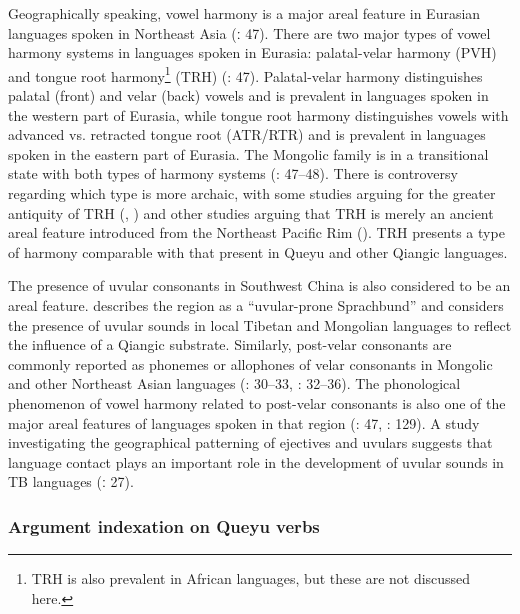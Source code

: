 \documentclass[output=paper]{langscibook}
\begin{document}
Geographically speaking, vowel harmony is a major areal feature in Eurasian languages spoken in Northeast Asia (\citealt{BarrereJanhunen2019}ː 47). There are two major types of vowel harmony systems in languages spoken in Eurasia: palatal-velar harmony (PVH) and tongue root harmony\footnote{TRH is also prevalent in African languages, but these are not discussed here.}  (TRH) (\citealt{BarrereJanhunen2019}: 47). Palatal-velar harmony distinguishes palatal (front) and velar (back) vowels and is prevalent in languages spoken in the western part of Eurasia, while tongue root harmony distinguishes vowels with advanced vs. retracted tongue root (ATR/RTR) and is prevalent in languages spoken in the eastern part of Eurasia. The Mongolic family is in a transitional state with both types of harmony systems (\citealt{BarrereJanhunen2019}: 47--48). There is controversy regarding which type is more archaic, with some studies arguing for the greater antiquity of TRH (\citealt{Ko2012}, \citealt{KoEtAl2014}) and other studies arguing that TRH is merely an ancient areal feature introduced from the Northeast Pacific Rim (\citealt{BarrereJanhunen2019}). TRH presents a type of harmony comparable with that present in Queyu and other Qiangic languages.

The presence of uvular consonants in Southwest China is also considered to be an areal feature. \citet[124]{Hill2019} describes the region as a “uvular-prone Sprachbund” and considers the presence of uvular sounds in local Tibetan and Mongolian languages to reflect the influence of a Qiangic substrate. Similarly, post-velar consonants are commonly reported as phonemes or allophones of velar consonants in Mongolic and other Northeast Asian languages (\citealt{Nugteren2011}: 30--33, \citealt{Sylak-Glassman2014}: 32--36). The phonological phenomenon of vowel harmony related to post-velar consonants is also one of the major areal features of languages spoken in that region (\citealt{BarrereJanhunen2019}: 47, \citealt{Robbeets2020}: 129). A study investigating the geographical patterning of ejectives and uvulars suggests that language contact plays an important role in the development of uvular sounds in TB languages (\citealt{UrbanMoran2021}ː 27).

\subsubsection{Argument indexation on Queyu verbs}\label{sec:guan:2.3.2}
\end{document}

